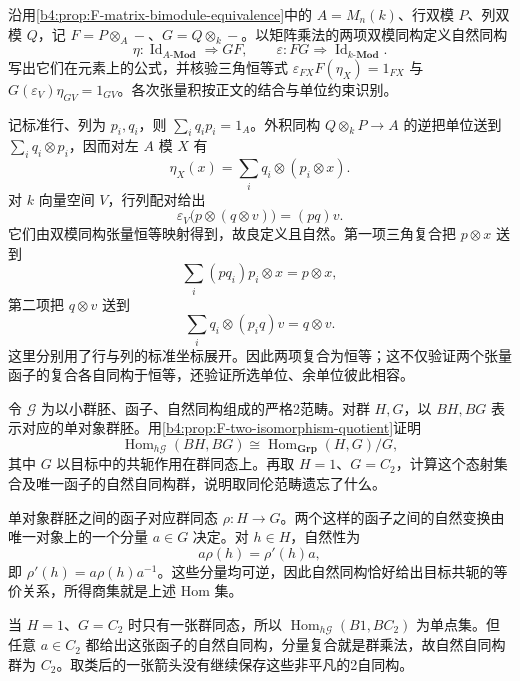 \begin{exercise}\label{b4:ex:F-matrix-bimodule-equivalence}
	沿用\cref{b4:prop:F-matrix-bimodule-equivalence}中的 \(A=M_n(k)\)、行双模 \(P\)、列双模 \(Q\)，记 \(F=P\otimes_A-\)、\(G=Q\otimes_k-\)。以矩阵乘法的两项双模同构定义自然同构
	\[
		\eta:\operatorname{Id}_{A\text{-}\mathbf{Mod}}\Longrightarrow GF, \qquad \varepsilon:FG\Longrightarrow\operatorname{Id}_{k\text{-}\mathbf{Mod}}.
	\]
	写出它们在元素上的公式，并核验三角恒等式 \(\varepsilon_{FX}F(\eta_X)=1_{FX}\) 与 \(G(\varepsilon_V)\eta_{GV}=1_{GV}\)。各次张量积按正文的结合与单位约束识别。
\end{exercise}
\begin{solution}
	记标准行、列为 \(p_i,q_i\)，则 \(\sum_iq_ip_i=1_A\)。外积同构 \(Q\otimes_kP\rightarrow A\) 的逆把单位送到 \(\sum_iq_i\otimes p_i\)，因而对左 \(A\) 模 \(X\) 有
	\[
		\eta_X(x)=\sum_iq_i\otimes(p_i\otimes x).
	\]
	对 \(k\) 向量空间 \(V\)，行列配对给出
	\[
		\varepsilon_V\bigl(p\otimes(q\otimes v)\bigr)=(pq)v.
	\]
	它们由双模同构张量恒等映射得到，故良定义且自然。第一项三角复合把 \(p\otimes x\) 送到
	\[
		\sum_i(pq_i)p_i\otimes x=p\otimes x,
	\]
	第二项把 \(q\otimes v\) 送到
	\[
		\sum_iq_i\otimes(p_iq)v=q\otimes v.
	\]
	这里分别用了行与列的标准坐标展开。因此两项复合为恒等；这不仅验证两个张量函子的复合各自同构于恒等，还验证所选单位、余单位彼此相容。
\end{solution}

\begin{exercise}\label{b4:ex:F-two-isomorphism-quotient}
	令 \(\mathcal G\) 为以小群胚、函子、自然同构组成的严格2范畴。对群 \(H,G\)，以 \(BH,BG\) 表示对应的单对象群胚。用\cref{b4:prop:F-two-isomorphism-quotient}证明
	\[
		\operatorname{Hom}_{h\mathcal G}(BH,BG) \cong\operatorname{Hom}_{\mathbf{Grp}}(H,G)/G,
	\]
	其中 \(G\) 以目标中的共轭作用在群同态上。再取 \(H=1\)、\(G=C_2\)，计算这个态射集合及唯一函子的自然自同构群，说明取同伦范畴遗忘了什么。
\end{exercise}
\begin{solution}
	单对象群胚之间的函子对应群同态 \(\rho:H\rightarrow G\)。两个这样的函子之间的自然变换由唯一对象上的一个分量 \(a\in G\) 决定。对 \(h\in H\)，自然性为
	\[
		a\rho(h)=\rho'(h)a,
	\]
	即 \(\rho'(h)=a\rho(h)a^{-1}\)。这些分量均可逆，因此自然同构恰好给出目标共轭的等价关系，所得商集就是上述 Hom 集。

	当 \(H=1\)、\(G=C_2\) 时只有一张群同态，所以 \(\operatorname{Hom}_{h\mathcal G}(B1,BC_2)\) 为单点集。但任意 \(a\in C_2\) 都给出这张函子的自然自同构，分量复合就是群乘法，故自然自同构群为 \(C_2\)。取类后的一张箭头没有继续保存这些非平凡的2自同构。
\end{solution}

